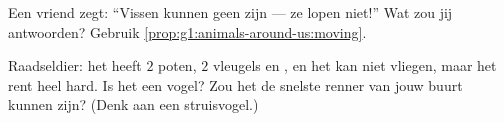 \begin{exercise}[$\star\star$]\label{exo:g1:animals-around-us:9}
Een vriend zegt: ``Vissen kunnen geen  zijn --- ze lopen niet!''
Wat zou jij antwoorden? Gebruik \cref{prop:g1:animals-around-us:moving}.
\end{exercise}

\begin{exercise}[$\star\star$]\label{exo:g1:animals-around-us:10}
Raadseldier: het heeft $2$ poten, $2$ vleugels en , en het kan
niet vliegen, maar het rent heel hard. Is het een vogel? Zou het de
snelste renner van jouw buurt kunnen zijn? (Denk aan een struisvogel.)
\end{exercise}
